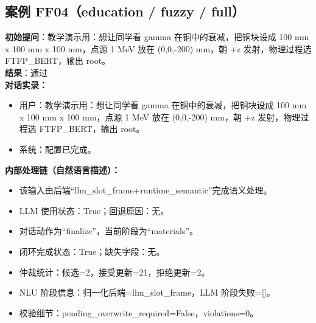 \documentclass[11pt]{ctexart}
\begin{document}
\subsection{案例 FF04（education / fuzzy / full）}
\textbf{初始提问}：教学演示用：想让同学看 gamma 在铜中的衰减，把铜块设成 100 mm x 100 mm x 100 mm，点源 1 MeV 放在 (0,0,-200) mm，朝 +z 发射，物理过程选 FTFP\_BERT，输出 root。\\
\textbf{结果}：通过\\
\textbf{对话实录：}
\begin{itemize}
\item 用户：教学演示用：想让同学看 gamma 在铜中的衰减，把铜块设成 100 mm x 100 mm x 100 mm，点源 1 MeV 放在 (0,0,-200) mm，朝 +z 发射，物理过程选 FTFP\_BERT，输出 root。
\item 系统：配置已完成。
\end{itemize}
\textbf{内部处理链（自然语言描述）：}
\begin{itemize}
\item 该输入由后端“llm\_slot\_frame+runtime\_semantic”完成语义处理。
\item LLM 使用状态：True；回退原因：无。
\item 对话动作为“finalize”，当前阶段为“materials”。
\item 闭环完成状态：True；缺失字段：无。
\item 仲裁统计：候选=2，接受更新=21，拒绝更新=2。
\item NLU 阶段信息：归一化后端=llm\_slot\_frame，LLM 阶段失败=[]。
\item 校验细节：pending\_overwrite\_required=False，violations=0。
\end{itemize}
\end{document}
